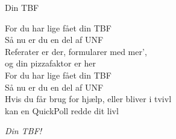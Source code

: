 \begin{song}{Din TBF}
  \begin{SBChorus}
    For du har lige fået din TBF\\
    Så nu er du en del af UNF\\
    Referater er der, formularer med mer’,\\
    og din pizzafaktor er her\\\medskip
    For du har lige fået din TBF\\
    Så nu er du en del af UNF\\
    Hvis du får brug for hjælp, eller bliver i tvivl\\
    kan en QuickPoll redde dit livl
  \end{SBChorus}

  \begin{SBSection*}
    \emph{Din TBF!}
  \end{SBSection*}
\end{song}






